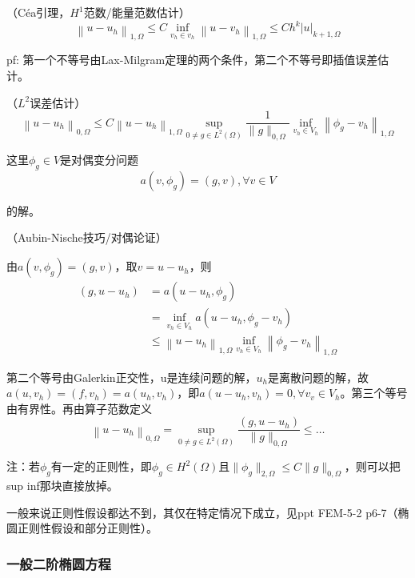 \begin{thm}
  （Céa引理，$H^1$范数/能量范数估计）
  \[
    \left\|u-u_{h}\right\|_{1, \Omega} \le C \inf _{v_{h} \in v_{h}}\left\|u-v_{h}\right\|_{1, \Omega} \le C h^{k}|u|_{k+1, \Omega}
  \]
\end{thm}
    
pf: 第一个不等号由Lax-Milgram定理的两个条件，第二个不等号即插值误差估计。

\begin{thm}
  （$L^2$误差估计）
  \[
    \left\|u-u_{h}\right\|_{0, \Omega} \le C\left\|u-u_{h}\right\|_{1, \Omega} \sup _{0 \neq g \in L^{2}(\Omega)} \frac{1}{\|g\|_{0, \Omega}} \inf _{v_{h} \in V_{h}}\left\|\phi_{g}-v_{h}\right\|_{1, \Omega}
  \]
  
  这里$\phi_{g} \in V$是对偶变分问题
  \[
    a(v, \phi_{g})=(g, v), \forall v \in V
  \]
  
  的解。
\end{thm}

\begin{pf}（Aubin-Nische技巧/对偶论证）

  由$a\left(v, \phi_{g}\right)=(g, v)$，取$v = u - u_h$，则
  \[
    \begin{aligned}
    \left(g, u-u_{h}\right) & =a\left(u-u_{h}, \phi_{g}\right) \\
    & =\inf _{v_{h} \in V_{h}} a\left(u-u_{h}, \phi_{g}-v_{h}\right) \\
    & \le\left\|u-u_{h}\right\|_{1, \Omega} \inf _{v_{h} \in V_{h}}\left\|\phi_{g}-v_{h}\right\|_{1, \Omega}
    \end{aligned}
  \]
  
  第二个等号由Galerkin正交性，u是连续问题的解，$u_h$是离散问题的解，故$a(u, v_h) = (f, v_h) = a(u_h, v_h)$，即$a(u - u_h, v_h) = 0, \forall v_v \in V_h$。第三个等号由有界性。再由算子范数定义
  \[
    \left\|u-u_{h}\right\|_{0, \Omega}=\sup _{0 \neq g \in L^{2}(\Omega)} \frac{\left(g, u-u_{h}\right)}{\|g\|_{0, \Omega}} \le \dots
  \]
\end{pf}

注：若$\phi_g$有一定的正则性，即$\phi_g \in H^2(\Omega)$且$\|\phi_g\|_{2, \Omega} \le C \|g\|_{0, \Omega}$，则可以把sup inf那块直接放掉。

一般来说正则性假设都达不到，其仅在特定情况下成立，见ppt FEM-5-2 p6-7（椭圆正则性假设和部分正则性）。

\subsubsection{一般二阶椭圆方程}

